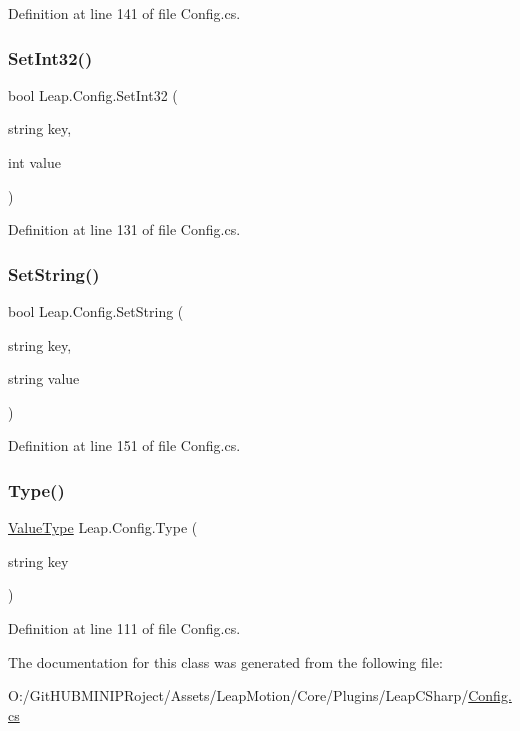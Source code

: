 Definition at line 141 of file Config.\+cs.

\mbox{\label{class_leap_1_1_config_a787f4eb383b5e56216345227efb6d378}} 
\subsubsection{\texorpdfstring{SetInt32()}{SetInt32()}}
{\footnotesize\ttfamily bool Leap.\+Config.\+Set\+Int32 (\begin{DoxyParamCaption}\item[{string}]{key,  }\item[{int}]{value }\end{DoxyParamCaption})}



Definition at line 131 of file Config.\+cs.

\mbox{\label{class_leap_1_1_config_a1fc49204d44638f4ffe3ea91449a2492}} 
\subsubsection{\texorpdfstring{SetString()}{SetString()}}
{\footnotesize\ttfamily bool Leap.\+Config.\+Set\+String (\begin{DoxyParamCaption}\item[{string}]{key,  }\item[{string}]{value }\end{DoxyParamCaption})}



Definition at line 151 of file Config.\+cs.

\mbox{\label{class_leap_1_1_config_a2fa1a76ec4aecb9d7a01aba0a2de4e00}} 
\subsubsection{\texorpdfstring{Type()}{Type()}}
{\footnotesize\ttfamily \mbox{\hyperlink{class_leap_1_1_config_aee9819af7eacacc324aa72619310a9d8}{Value\+Type}} Leap.\+Config.\+Type (\begin{DoxyParamCaption}\item[{string}]{key }\end{DoxyParamCaption})}



Definition at line 111 of file Config.\+cs.



The documentation for this class was generated from the following file\+:\begin{DoxyCompactItemize}
\item 
O\+:/\+Git\+H\+U\+B\+M\+I\+N\+I\+P\+Roject/\+Assets/\+Leap\+Motion/\+Core/\+Plugins/\+Leap\+C\+Sharp/\mbox{\hyperlink{_config_8cs}{Config.\+cs}}\end{DoxyCompactItemize}
